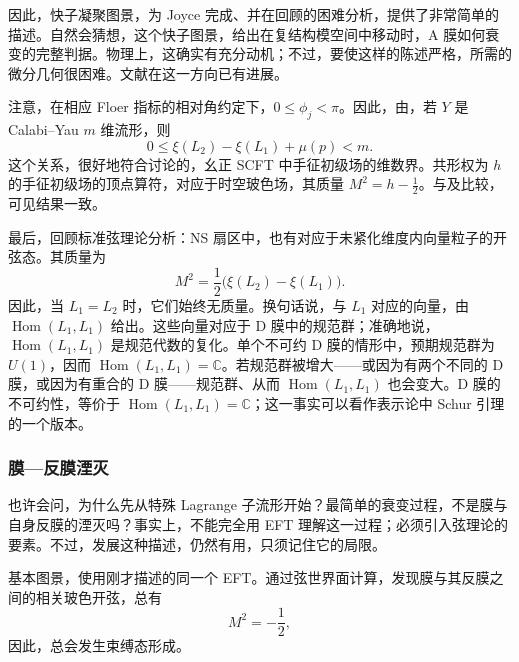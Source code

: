 因此，快子凝聚图景，为 Joyce 完成、并在回顾的困难分析，提供了非常简单的描述。自然会猜想，这个快子图景，给出在复结构模空间中移动时，A 膜如何衰变的完整判据。物理上，这确实有充分动机；不过，要使这样的陈述严格，所需的微分几何很困难。文献在这一方向已有进展。

注意，在相应 Floer 指标的相对角约定下，$0\le\phi_j<\pi$。因此，由，若 $Y$ 是 Calabi--Yau $m$ 维流形，则
\begin{equation}\label{eq:5.97}
0\le\xi(L_2)-\xi(L_1)+\mu(p)<m.
\end{equation}
这个关系，很好地符合讨论的，幺正 SCFT 中手征初级场的维数界。共形权为 $h$ 的手征初级场的顶点算符，对应于时空玻色场，其质量 $M^2=h-\tfrac12$。与及比较，可见结果一致。

最后，回顾标准弦理论分析：NS 扇区中，也有对应于未紧化维度内向量粒子的开弦态。其质量为
\begin{equation}\label{eq:5.98}
M^2=\frac12\bigl(\xi(L_2)-\xi(L_1)\bigr).
\end{equation}
因此，当 $L_1=L_2$ 时，它们始终无质量。换句话说，与 $L_1$ 对应的向量，由 $\operatorname{Hom}(L_1,L_1)$ 给出。这些向量对应于 D 膜中的规范群；准确地说，$\operatorname{Hom}(L_1,L_1)$ 是规范代数的复化。单个不可约 D 膜的情形中，预期规范群为 $U(1)$，因而 $\operatorname{Hom}(L_1,L_1)=\mathbb{C}$。若规范群被增大——或因为有两个不同的 D 膜，或因为有重合的 D 膜——规范群、从而 $\operatorname{Hom}(L_1,L_1)$ 也会变大。D 膜的不可约性，等价于 $\operatorname{Hom}(L_1,L_1)=\mathbb{C}$；这一事实可以看作表示论中 Schur 引理的一个版本。

\subsubsection{膜—反膜湮灭}\label{sec:5.4.4.4}

也许会问，为什么先从特殊 Lagrange 子流形开始？最简单的衰变过程，不是膜与自身反膜的湮灭吗？事实上，不能完全用 EFT 理解这一过程；必须引入弦理论的要素。不过，发展这种描述，仍然有用，只须记住它的局限。

基本图景，使用刚才描述的同一个 EFT。通过弦世界面计算，发现膜与其反膜之间的相关玻色开弦，总有
\[
M^2=-\frac12,
\]
因此，总会发生束缚态形成。

